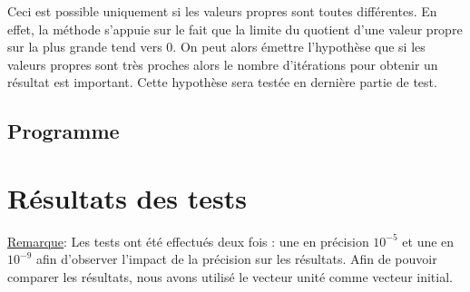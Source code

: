 \documentclass{report}
\begin{document}
      Ceci est possible uniquement si les valeurs propres sont toutes différentes. En effet, la méthode s'appuie sur le fait que la limite du quotient d'une valeur propre sur la plus grande tend vers 0. On peut alors émettre l'hypothèse que si les valeurs propres sont très proches alors le nombre d'itérations pour obtenir un résultat est important. Cette hypothèse sera testée en dernière partie de test.
      
      \subsection{Programme}
	
    \newpage
    \section{Résultats des tests}
      \underline{Remarque}: Les tests ont été effectués deux fois : une en précision $10^{-5}$ et une en $10^{-9}$ afin d'observer l'impact de la précision sur les résultats. Afin de pouvoir comparer les résultats, nous avons utilisé le vecteur unité comme vecteur initial.
\end{document}
